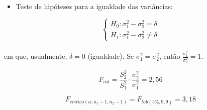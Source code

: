 \documentclass[
]{book}
\providecommand{\tightlist}{%
  \setlength{\itemsep}{0pt}\setlength{\parskip}{0pt}}
\begin{document}
\hfill\break

\begin{itemize}
\tightlist
\item
  Teste de hipóteses para a igualdade das variâncias:
\end{itemize}

\[
\begin{cases}
H_{0}: \sigma_{1}^{2}-\sigma_{2}^{2}=\delta \\
H_{1}: \sigma_{1}^{2} - \sigma_{2}^{2} \ne \delta
\end{cases}
\]\\

em que, usualmente, \(\delta=0\) (igualdade). Se \(\sigma_{1}^{2}=\sigma_{2}^{2}\), então \(\frac{\sigma_{1}^{2}}{\sigma_{2}^{2}}=1\).

\hfill\break

\[
F_{cal}=\frac{{S}_{2}^{2}}{{S}_{1}^{2}}\cdot \frac{{\sigma }_{2}^{2}}{{\sigma }_{1}^2}=2,56
\]

\[
F_{critico\left(\alpha ,{n}_{1}-1,{n}_{2}-1\right)} = F_{tab\left(5\% ,9,9\right)} = 3,18
\]

\hfill\break
\end{document}
